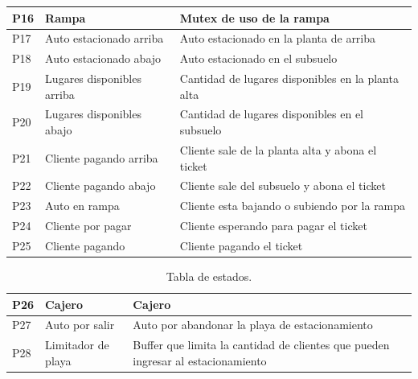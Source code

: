 \documentclass[12pt,a4paper]{article}
\begin{document}
\begin{table}[H]
\begin{tabular}[width=15cm]{ || C{1.5cm} | L{5cm} | L{8.5cm} || }
	P16 & Rampa & Mutex de uso de la rampa  \\ \hline
	P17 & Auto estacionado arriba & Auto estacionado en la planta de arriba  \\ \hline
	P18 & Auto estacionado abajo & Auto estacionado en el subsuelo  \\ \hline
	P19 & Lugares disponibles arriba & Cantidad de lugares disponibles en la planta alta \\ \hline
	P20 & Lugares disponibles abajo & Cantidad de lugares disponibles en el subsuelo  \\ \hline
	P21 & Cliente pagando arriba & Cliente sale de la planta alta y abona el ticket   \\ \hline
	P22 & Cliente pagando abajo & Cliente sale del subsuelo y abona el ticket  \\ \hline
	P23 & Auto en rampa & Cliente esta bajando o subiendo por la rampa  \\ \hline
	P24 & Cliente por pagar & Cliente esperando para pagar el ticket  \\ \hline
	P25 & Cliente pagando & Cliente pagando el ticket \\ \hline
\end{tabular}
\end{table}
\begin{table}[H]
\centering
\begin{tabular}[width=15cm]{ || C{1.5cm} | L{5cm} | L{8.5cm} || }
\hline
	P26 & Cajero & Cajero \\ \hline
	P27 & Auto por salir & Auto por abandonar la playa de estacionamiento \\ \hline
	P28 & Limitador de playa & Buffer que limita la cantidad de clientes que pueden ingresar al estacionamiento \\ \hline
\end{tabular}
\caption{Tabla de estados.}
\label{table:plazas}
\end{table}
\end{document}

